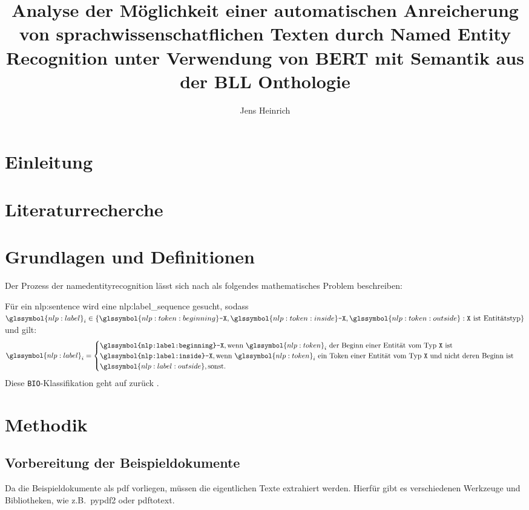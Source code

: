 \documentclass[
german,
]{bachelor}
\author{Jens Heinrich}
\title{%
Analyse der Möglichkeit
einer automatischen Anreicherung von sprachwissenschatflichen Texten
durch Named Entity Recognition
unter Verwendung von BERT
mit Semantik aus der BLL Onthologie%
}
\begin{document}
\maketitle

\section{Einleitung}

\section{Literaturrecherche}

\section{Grundlagen und Definitionen}
\begin{prob}{}
Der Prozess der \gls{namedentityrecognition}
lässt sich nach \autocite{Liang_2020} als folgendes mathematisches Problem beschreiben:

Für ein \gls{nlp:sentence} 
wird eine \gls{nlp:label_sequence}  gesucht,
sodass \(
\glssymbol{nlp:label}_i \in
\left\lbrace
	\glssymbol{nlp:token:beginning}\texttt{-X},
	\glssymbol{nlp:token:inside}\texttt{-X},
	\glssymbol{nlp:token:outside}
	:
	\text{\texttt{X} ist Entitätstyp}
\right\rbrace
\)
und gilt:
\[
	\glssymbol{nlp:label}_i =
	\begin{cases}
		\texttt{\glssymbol{nlp:label:beginning}-X},
		\text{wenn \(\glssymbol{nlp:token}_i\)
		der Beginn einer Entität vom Typ \(\texttt{X}\) ist
	}\\
	\texttt{\glssymbol{nlp:label:inside}-X},
		\text{wenn \(\glssymbol{nlp:token}_i\)
		ein Token einer Entität vom Typ \(\texttt{X}\)
		und nicht deren Beginn ist
	}\\
	\glssymbol{nlp:label:outside}, \text{sonst}.
\end{cases}
\]
Diese \texttt{BIO}-Klassifikation geht auf \citeauthor{10.1145/2396761.2398506} zurück \autocite{10.1145/2396761.2398506}.
\end{prob}



\section{Methodik}

\subsection{Vorbereitung der Beispieldokumente}
Da die Beispieldokumente als \gls{pdf} vorliegen,
müssen die eigentlichen Texte extrahiert werden.
Hierfür gibt es verschiedenen Werkzeuge und Bibliotheken,
wie z.B.\, \gls{pypdf2} oder \gls{pdftotext}.
\end{document}
